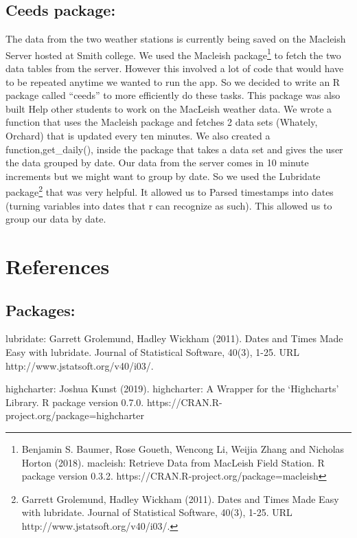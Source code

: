 \documentclass[10pt,letterpaper]{article}
\begin{document}
\subsection{Ceeds package:}\label{ceeds-package}

The data from the two weather stations is currently being saved on the
Macleish Server hosted at Smith college. We used the Macleish
package\footnote{Benjamin S. Baumer, Rose Goueth, Wencong Li, Weijia
  Zhang and Nicholas Horton (2018). macleish: Retrieve Data from
  MacLeish Field Station. R package version 0.3.2.
  https://CRAN.R-project.org/package=macleish} to fetch the two data
tables from the server. However this involved a lot of code that would
have to be repeated anytime we wanted to run the app. So we decided to
write an R package called ``ceeds'' to more efficiently do these tasks.
This package was also built Help other students to work on the MacLeish
weather data. We wrote a function that uses the Macleish package and
fetches 2 data sets (Whately, Orchard) that is updated every ten
minutes. We also created a function,get\_daily(), inside the package
that takes a data set and gives the user the data grouped by date. Our
data from the server comes in 10 minute increments but we might want to
group by date. So we used the Lubridate package\footnote{Garrett
  Grolemund, Hadley Wickham (2011). Dates and Times Made Easy with
  lubridate. Journal of Statistical Software, 40(3), 1-25. URL
  http://www.jstatsoft.org/v40/i03/.} that was very helpful. It allowed
us to Parsed timestamps into dates (turning variables into dates that r
can recognize as such). This allowed us to group our data by date.

\section*{References}\label{references}

\subsection{Packages:}\label{packages}

lubridate: Garrett Grolemund, Hadley Wickham (2011). Dates and Times
Made Easy with lubridate. Journal of Statistical Software, 40(3), 1-25.
URL http://www.jstatsoft.org/v40/i03/.

highcharter: Joshua Kunst (2019). highcharter: A Wrapper for the
`Highcharts' Library. R package version 0.7.0.
https://CRAN.R-project.org/package=highcharter
\end{document}
